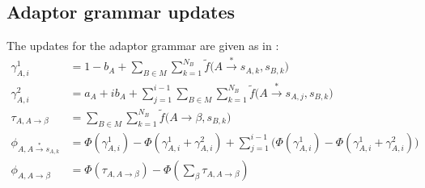 \documentclass[12pt,letterpaper]{article}
\begin{document}
\subsection{Adaptor grammar updates}
The updates for the adaptor grammar are given as in \citet{cohen:2010}: 
\begin{align*}
\gamma^1_{A,i} &= 1-b_A + \sum\limits_{B\in M} \sum\limits_{k=1}^{N_B} \tilde f \Big(A \overset{*}{\rightarrow} s_{A,k}, s_{B,k}\Big)\\
\gamma^2_{A,i} &= a_A + ib_A + \sum\limits_{j=1}^{i-1}\sum\limits_{B\in M}\sum\limits_{k=1}^{N_B} \tilde f\Big(A \overset{*}{\rightarrow} s_{A,j}, s_{B,k}\Big)\\
\tau_{A, A\rightarrow \beta} &= \sum\limits_{B\in M}\sum\limits_{k=1}^{N_B} \tilde f\big(A \rightarrow \beta, s_{B,k}\big)\\
\phi_{A,A \overset{*}{\rightarrow} s_{A,k}} &= \Phi(\gamma^1_{A,i}) - \Phi(\gamma^1_{A,i}  + \gamma^2_{A,i}) + \sum\limits_{j=1}^{i-1}\big(\Phi(\gamma^1_{A,i}) - \Phi(\gamma^1_{A,i}  + \gamma^2_{A,i}) \big) \\
\phi_{A, A\rightarrow \beta} &= \Phi(\tau_{A,A\rightarrow \beta}) - \Phi(\sum\limits_{\beta} \tau_{A,A\rightarrow \beta})\\
\end{align*}
\end{document}
